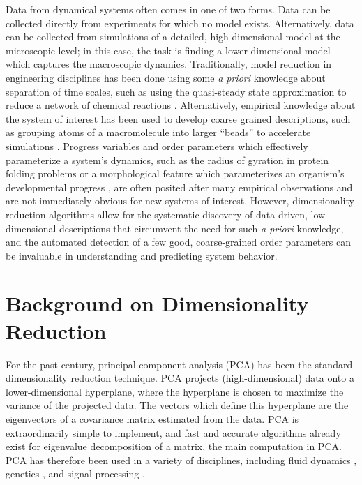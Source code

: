Data from dynamical systems often comes in one of two forms. 
%
Data can be collected directly from experiments for which no model exists. 
%
Alternatively, data can be collected from simulations of a detailed, high-dimensional model at the microscopic level; in this case, the task is finding a lower-dimensional model which captures the macroscopic dynamics. 
%
Traditionally, model reduction in engineering disciplines has been done using some {\em a priori} knowledge about separation of time scales,
such as using the quasi-steady state approximation to reduce a network of chemical reactions \cite{bowen1963singular}.
%
Alternatively, empirical knowledge about the system of interest has been used to develop coarse grained descriptions, such as grouping atoms of a macromolecule into larger ``beads'' to accelerate simulations \cite{izvekov2005systematic, monticelli2008martini, saunders2013coarse, spiga2013electrostatic}.
%
Progress variables and order parameters which effectively parameterize a system's dynamics, such as the radius of gyration in protein folding problems \cite{lazaridis1997new, kim2015systematic} or a  morphological feature which parameterizes an organism's developmental progress \cite{dubuis2013accurate, hamaratoglu2011dpp}, are often posited after many empirical observations and are not immediately obvious for new systems of interest. 
%
However, dimensionality reduction algorithms allow for the systematic discovery of data-driven, low-dimensional descriptions that circumvent the need for such {\em a priori} knowledge, and the automated detection of a few good, coarse-grained
order parameters can be invaluable in understanding and predicting system behavior.
%


\section{Background on Dimensionality Reduction} \label{sec:background}


For the past century, principal component analysis (PCA) \cite{shlens2005tutorial} has been the standard dimensionality reduction technique.
%
PCA projects (high-dimensional) data onto a lower-dimensional hyperplane, where the hyperplane is chosen to maximize the variance of the projected data. 
%
The vectors which define this hyperplane are the eigenvectors of a covariance matrix estimated from the data. 
%
PCA is extraordinarily simple to implement, and fast and accurate algorithms already exist for eigenvalue decomposition of a matrix, the main computation in PCA.
%
PCA has therefore been used in a variety of disciplines, including fluid dynamics \cite{rowley2004model, kunisch2002galerkin}, genetics \cite{alter2000singular, troyanskaya2001missing}, and signal processing \cite{vaseghi2008advanced}. 

